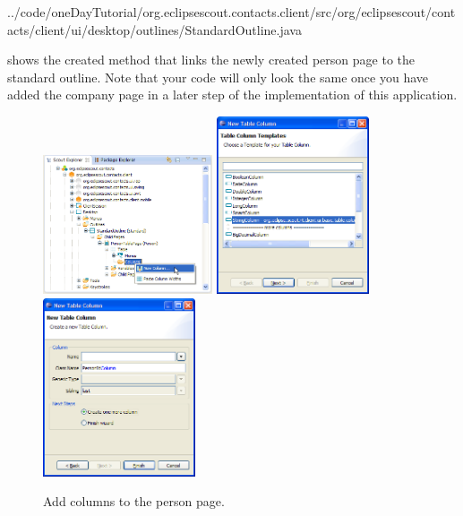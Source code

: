 \documentclass[a4paper,10pt,twoside]{book}
\begin{document}

{../code/oneDayTutorial/org.eclipsescout.contacts.client/src/org/eclipsescout/contacts/client/ui/desktop/outlines/StandardOutline.java}

 shows the created method  that links the newly created person page to the standard outline. 
Note that your code will only look the same once you have added the company page in a later step of the implementation of this application.

\begin{figure}
\includegraphics[width=5cm]{new_column_personid_contextmenu.png} \hspace{2mm}
\includegraphics[width=4.5cm]{new_column_personid_1.png} \hspace{2mm}
\includegraphics[width=4.5cm]{new_column_personid_2.png}
\caption{Add columns to the person page.}
\end{figure}
\end{document}
